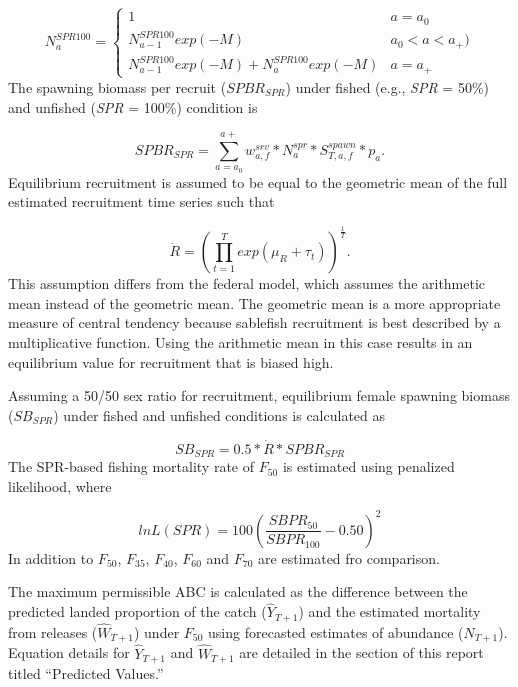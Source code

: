 \documentclass[
]{article}
\begin{document}
\[
\begin{equation}
N_{a}^{SPR100} = \left\{ \begin{array}{lll}
1 &a = a_{0}\\
N_{a-1}^{SPR100}exp(-M) &a_{0} < a < a_{+})\\
N_{a-1}^{SPR100}exp(-M) +  N_{a}^{SPR100}exp(-M) &a=a_{+}
\end{array}\right.
\label{eq:Nspr100}
\end{equation}
\]
The spawning biomass per recruit (\({SPBR}_{SPR}\)) under fished (e.g., \emph{SPR} = 50\%) and unfished (\emph{SPR} = 100\%) condition is

\[
\begin{equation}
SPBR_{SPR}={\sum_{a=a_0}^{a+}}w_{a,f}^{srv}*N_a^{spr}*S_{T,a,f}^{spawn}*p_a.
\label{eq:SPBRSPR}
\end{equation}
\]
Equilibrium recruitment is assumed to be equal to the geometric mean of the full estimated recruitment time series such that

\[
\begin{equation}
\dot{R}=({\prod_{t=1}^{T}exp(\mu_R+\tau_t)})^{\frac{1}{T}}.
\label{eq:SPBRSPR}
\end{equation}
\]
This assumption differs from the federal model, which assumes the arithmetic mean instead of the geometric mean. The geometric mean is a more appropriate measure of central tendency because sablefish recruitment is best described by a multiplicative function. Using the arithmetic mean in this case results in an equilibrium value for recruitment that is biased high.

Assuming a 50/50 sex ratio for recruitment, equilibrium female spawning biomass (\({SB}_{SPR}\)) under fished and unfished conditions is calculated as

\[
\begin{equation}
SB_{SPR}=0.5*\dot{R}*SPBR_{SPR}
\label{eq:SBSPR}
\end{equation}
\]
The SPR-based fishing mortality rate of \(F_{50}\) is estimated using penalized likelihood, where

\[
\begin{equation}
lnL(SPR) = 100({\frac{SBPR_{50}}{SBPR_{100}}-0.50})^2
\label{eq:lnSPR}
\end{equation}
\]
In addition to \(F_{50}\), \(F_{35}\), \(F_{40}\), \(F_{60}\) and \(F_{70}\) are estimated fro comparison.

The maximum permissible ABC is calculated as the difference between the predicted landed proportion of the catch (\(\hat{Y}_{T+1}\)) and the estimated mortality from releases (\(\hat{W}_{T+1}\)) under \(F_{50}\) using forecasted estimates of abundance (\(N_{T+1}\)). Equation details for \(\hat{Y}_{T+1}\) and \(\hat{W}_{T+1}\) are detailed in the section of this report titled ``Predicted Values.''
\end{document}
